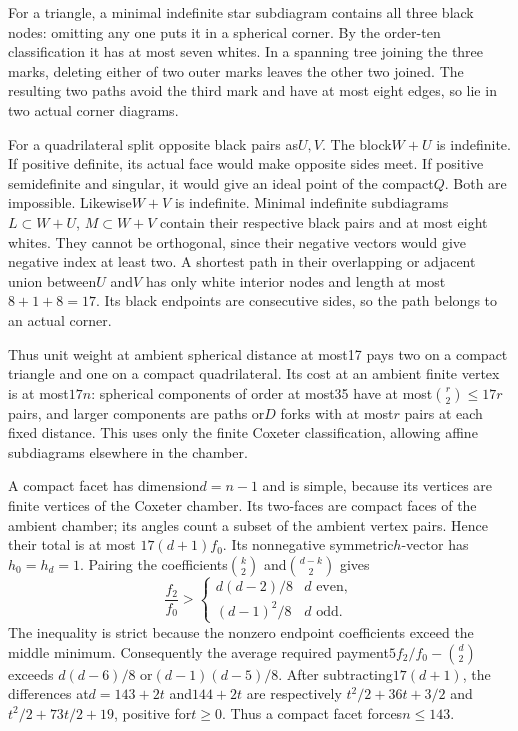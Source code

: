 \documentclass[11pt]{article}
\theoremstyle{remark}\newtheorem{remark}[theorem]{Remark}
\begin{document}
For a triangle, a minimal indefinite star subdiagram contains all
three black nodes: omitting any one puts it in a spherical corner.
By the order-ten classification it has at most seven whites.
In a spanning tree joining the three marks, deleting either of
two outer marks leaves the other two joined. The resulting two
paths avoid the third mark and have at most eight edges, so lie
in two actual corner diagrams.

For a quadrilateral split opposite black pairs as$U,V$.
The block$W+U$ is indefinite. If positive definite, its actual
face would make opposite sides meet. If positive semidefinite
and singular, it would give an ideal point of the compact$Q$.
Both are impossible. Likewise$W+V$ is indefinite.
Minimal indefinite subdiagrams$L\subset W+U$, $M\subset W+V$
contain their respective black pairs and at most eight whites.
They cannot be orthogonal, since their negative vectors would
give negative index at least two. A shortest path in their
overlapping or adjacent union between$U$ and$V$ has only white
interior nodes and length at most$8+1+8=17$. Its black endpoints
are consecutive sides, so the path belongs to an actual corner.

Thus unit weight at ambient spherical distance at most17 pays
two on a compact triangle and one on a compact quadrilateral.
Its cost at an ambient finite vertex is at most$17n$: spherical
components of order at most35 have at most$\binom r2\le17r$
pairs, and larger components are paths or$D$ forks with at most$r$
pairs at each fixed distance. This uses only the finite Coxeter
classification, allowing affine subdiagrams elsewhere in the chamber.

A compact facet has dimension$d=n-1$ and is simple, because its
vertices are finite vertices of the Coxeter chamber. Its two-faces
are compact faces of the ambient chamber; its angles count a
subset of the ambient vertex pairs. Hence their total is at most
$17(d+1)f_0$. Its nonnegative symmetric$h$-vector has$h_0=h_d=1$.
Pairing the coefficients$\binom k2$ and$\binom{d-k}2$ gives
\[
 \frac{f_2}{f_0}>
 \begin{cases}d(d-2)/8&d\text{ even},\\
 (d-1)^2/8&d\text{ odd}.
 \end{cases}
\]
The inequality is strict because the nonzero endpoint coefficients
exceed the middle minimum. Consequently the average required
payment$5f_2/f_0-\binom d2$ exceeds
$d(d-6)/8$ or$(d-1)(d-5)/8$. After subtracting$17(d+1)$,
the differences at$d=143+2t$ and$144+2t$ are respectively
$t^2/2+36t+3/2$ and$t^2/2+73t/2+19$, positive for$t\ge0$.
Thus a compact facet forces$n\le143$.
\end{document}

